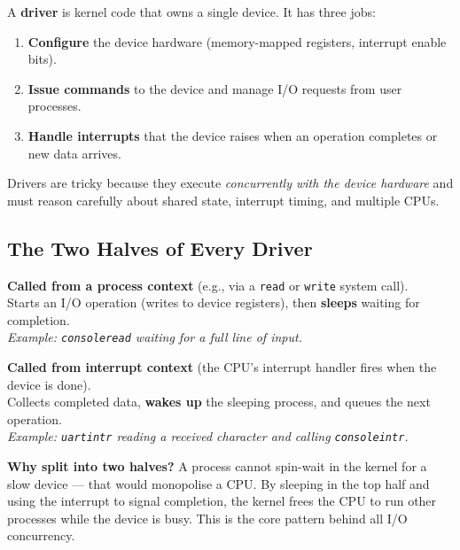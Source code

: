 \documentclass[11pt, a4paper]{article}
\begin{document}
A \textbf{driver} is kernel code that owns a single device. It has three jobs:

\begin{enumerate}[leftmargin=2em]
  \item \textbf{Configure} the device hardware (memory-mapped registers, interrupt enable bits).
  \item \textbf{Issue commands} to the device and manage I/O requests from user processes.
  \item \textbf{Handle interrupts} that the device raises when an operation completes or new data arrives.
\end{enumerate}

Drivers are tricky because they execute \emph{concurrently with the device hardware} and must reason carefully about shared state, interrupt timing, and multiple CPUs.

\subsection{The Two Halves of Every Driver}

\begin{tcolorbox}[tophalf]
\textbf{Called from a process context} (e.g., via a \lstinline|read| or \lstinline|write| system call).\\
Starts an I/O operation (writes to device registers), then \textbf{sleeps} waiting for completion.\\
\emph{Example: \lstinline|consoleread| waiting for a full line of input.}
\end{tcolorbox}

\vspace{0.5em}

\begin{tcolorbox}[bottomhalf]
\textbf{Called from interrupt context} (the CPU's interrupt handler fires when the device is done).\\
Collects completed data, \textbf{wakes up} the sleeping process, and queues the next operation.\\
\emph{Example: \lstinline|uartintr| reading a received character and calling \lstinline|consoleintr|.}
\end{tcolorbox}

\vspace{0.5em}

\begin{tcolorbox}[foundational]
\textbf{Why split into two halves?} A process cannot spin-wait in the kernel for a slow device --- that would monopolise a CPU. By sleeping in the top half and using the interrupt to signal completion, the kernel frees the CPU to run other processes while the device is busy. This is the core pattern behind all I/O concurrency.
\end{tcolorbox}
\end{document}
